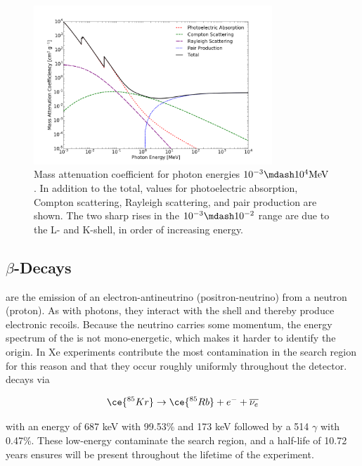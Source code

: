 \begin{figure}
 \centering
 \includegraphics[width=0.8\textwidth]{PhotonAttenuation}
 \caption{Mass attenuation coefficient for photon energies $10^{-3} \mdash 10^{4} \mathrm{MeV}$.  In addition to the total, values for
 photoelectric absorption, Compton scattering, Rayleigh scattering, and pair production are shown.  The two sharp rises in the
 $10^{-3} \mdash 10^{-2}$ range are due to the L- and K-shell, in order of increasing energy.}
 \label{fig:phot_atten}
\end{figure}


\subsection{$\beta$-Decays}
\label{subsec:beta}
\betadecays are the emission of an electron-antineutrino (positron-neutrino) from a neutron (proton).  As with photons, they interact
with the \electron shell and thereby produce electronic recoils.  Because the neutrino carries
some momentum, the energy spectrum of the \electron is not mono-energetic, which makes it harder to identify the origin.  In Xe
experiments \betadecays contribute the most contamination in the search region for this reason and that they occur roughly uniformly
throughout the detector.  \krypton decays via

\begin{equation}
\ce{^{85}Kr} \rightarrow \ce{^{85}Rb} + e^{-} + \overline{\nu_{e}}
\end{equation}

\noindent with an energy of 687 keV with 99.53\% and 173 keV followed by a 514 $\gamma$ with 0.47\%.  These low-energy \betadecays
contaminate the search region, and a half-life of 10.72 years ensures  will be present throughout the lifetime of the
experiment.

